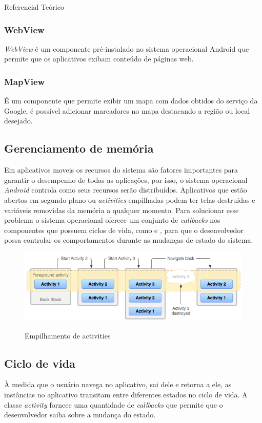 \documentclass[
	12pt,				%
	openright,			%
	twoside,			%
	a4paper,			%
	english,			%
	french,				%
	spanish,			%
	brazil				%
	]{abntex2}
\begin{document}
\begin{chapter}{Referencial Teórico}
\subsubsection{WebView} \label{WebView}
\textit{WebView} é um componente pré-instalado no sistema operacional Android que permite que os aplicativos exibam conteúdo de páginas web.

\subsubsection{MapView} \label{MapView}
É um componente que permite exibir um mapa com dados obtidos do serviço da Google, é possível adicionar marcadores no mapa destacando a região ou local desejado.


\newpage
\subsection{Gerenciamento de memória}
Em aplicativos moveis os recursos do sistema são fatores importantes para garantir o desempenho de todas as aplicações, por isso, o sistema operacional \textit{Android} controla como seus recursos serão distribuídos. Aplicativos que estão abertos em segundo plano ou \textit{activities} empilhadas podem ter telas destruídas e variáveis removidas da memória a qualquer momento. Para solucionar esse problema o sistema operacional oferece um conjunto de \textit{callbacks} nos componentes que possuem ciclos de vida, como  e , para que o desenvolvedor possa controlar os comportamentos durante as mudanças de estado do sistema.

\begin{figure}[h]
\centering
   \caption{Empilhamento de activities}
   \includegraphics[scale=0.70]{media/diagram_backstack.png}
     \label{fig:backstack}
\end{figure}

\subsection{Ciclo de vida}
À medida que o usuário navega no aplicativo, sai dele e retorna a ele, as instâncias  no aplicativo transitam entre diferentes estados no ciclo de vida. A classe \textit{activity} fornece uma quantidade de \textit{callbacks} que permite que o desenvolvedor saiba sobre a mudança do estado.


\end{chapter}
\end{document}
